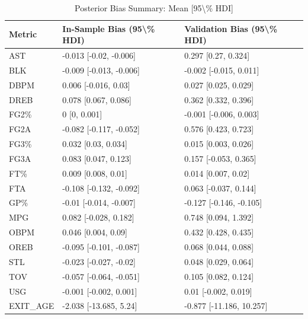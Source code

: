 \begin{table}[t]
\caption*{
{\fontsize{20}{25}\selectfont  Posterior Bias Summary: Mean [95\textbackslash{}\% HDI]\fontsize{12}{15}\selectfont }
} 
\fontsize{12.0pt}{14.0pt}\selectfont
\begin{tabular*}{\linewidth}{@{\extracolsep{\fill}}lll}
\toprule
Metric & In-Sample Bias (95\textbackslash{}\% HDI) & Validation Bias (95\textbackslash{}\% HDI) \\ 
\midrule\addlinespace[2.5pt]
AST & -0.013 [-0.02, -0.006] & 0.297 [0.27, 0.324] \\ 
BLK & -0.009 [-0.013, -0.006] & -0.002 [-0.015, 0.011] \\ 
DBPM & 0.006 [-0.016, 0.03] & 0.027 [0.025, 0.029] \\ 
DREB & 0.078 [0.067, 0.086] & 0.362 [0.332, 0.396] \\ 
FG2\% & 0 [0, 0.001] & -0.001 [-0.006, 0.003] \\ 
FG2A & -0.082 [-0.117, -0.052] & 0.576 [0.423, 0.723] \\ 
FG3\% & 0.032 [0.03, 0.034] & 0.015 [0.003, 0.026] \\ 
FG3A & 0.083 [0.047, 0.123] & 0.157 [-0.053, 0.365] \\ 
FT\% & 0.009 [0.008, 0.01] & 0.014 [0.007, 0.02] \\ 
FTA & -0.108 [-0.132, -0.092] & 0.063 [-0.037, 0.144] \\ 
GP\% & -0.01 [-0.014, -0.007] & -0.127 [-0.146, -0.105] \\ 
MPG & 0.082 [-0.028, 0.182] & 0.748 [0.094, 1.392] \\ 
OBPM & 0.046 [0.004, 0.09] & 0.432 [0.428, 0.435] \\ 
OREB & -0.095 [-0.101, -0.087] & 0.068 [0.044, 0.088] \\ 
STL & -0.023 [-0.027, -0.02] & 0.048 [0.029, 0.064] \\ 
TOV & -0.057 [-0.064, -0.051] & 0.105 [0.082, 0.124] \\ 
USG & -0.001 [-0.002, 0.001] & 0.01 [-0.002, 0.019] \\ 
EXIT\_AGE & -2.038 [-13.685, 5.24] & -0.877 [-11.186, 10.257] \\ 
\bottomrule
\end{tabular*}
\end{table}

